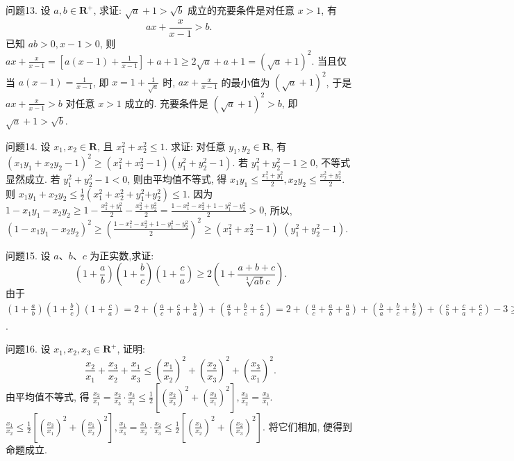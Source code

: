 问题13. 设 $a, b \in \mathbf{R}^{+}$, 求证: $\sqrt{a}+1>\sqrt{b}$ 成立的充要条件是对任意 $x>1$, 有
$$
a x+\frac{x}{x-1}>b \text {. }
$$
已知 $a b>0, x-1>0$, 则 $a x+\frac{x}{x-1}=\left[a(x-1)+\frac{1}{x-1}\right]+a+1 \geqslant 2 \sqrt{a}+a+1=(\sqrt{a}+1)^2$. 当且仅当 $a(x-1)=\frac{1}{x-1}$, 即 $x=1+\frac{1}{\sqrt{a}}$ 时, $a x+\frac{x}{x-1}$ 的最小值为 $(\sqrt{a}+1)^2$, 于是 $a x+\frac{x}{x-1}>b$ 对任意 $x>1$ 成立的.
充要条件是 $(\sqrt{a}+1)^2>b$, 即 $\sqrt{a}+1>\sqrt{b}$.



问题14. 设 $x_1, x_2 \in \mathbf{R}$, 且 $x_1^2+x_2^2 \leqslant 1$. 求证: 对任意 $y_1, y_2 \in \mathbf{R}$, 有 $\left(x_1 y_1+\right. \left.x_2 y_2-1\right)^2 \geqslant\left(x_1^2+x_2^2-1\right)\left(y_1^2+y_2^2-1\right)$.
若 $y_1^2+y_2^2-1 \geqslant 0$, 不等式显然成立.
若 $y_1^2+y_2^2-1<0$, 则由平均值不等式, 得 $x_1 y_1 \leqslant \frac{x_1^2+y_1^2}{2}, x_2 y_2 \leqslant \frac{x_2^2+y_2^2}{2}$. 则 $x_1 y_1+x_2 y_2 \leqslant \frac{1}{2}\left(x_1^2+x_2^2+y_1^2\right. \left.+y_2^2\right) \leqslant 1$. 因为 $1-x_1 y_1-x_2 y_2 \geqslant 1-\frac{x_1^2+y_1^2}{2}-\frac{x_2^2+y_2^2}{2}=\frac{1-x_1^2-x_2^2+1-y_1^2-y_2^2}{2} >0$, 所以, $\left(1-x_1 y_1-x_2 y_2\right)^2 \geqslant\left(\frac{1-x_1^2-x_2^2+1-y_1^2-y_2^2}{2}\right)^2 \geqslant\left(x_1^2+x_2^2-1\right)$  $\left(y_1^2+y_2^2-1\right)$.



问题15. 设 $a 、 b 、 c$ 为正实数,求证:
$$
\left(1+\frac{a}{b}\right)\left(1+\frac{b}{c}\right)\left(1+\frac{c}{a}\right) \geqslant 2\left(1+\frac{a+b+c}{\sqrt[3]{a b} c}\right) .
$$
由于 $\left(1+\frac{a}{b}\right)\left(1+\frac{b}{c}\right)\left(1+\frac{c}{a}\right)=2+\left(\frac{a}{c}+\frac{c}{b}+\frac{b}{a}\right)+ \left(\frac{a}{b}+\frac{b}{c}+\frac{c}{a}\right)=2+\left(\frac{a}{c}+\frac{a}{b}+\frac{a}{a}\right)+\left(\frac{b}{a}+\frac{b}{c}+\frac{b}{b}\right)+\left(\frac{c}{b}+\frac{c}{a}+\frac{c}{c}\right)- 3 \geqslant-1+3 \frac{a+b+c}{\sqrt[3]{a b c}} \geqslant 2\left(1+\frac{a+b+c}{\sqrt[3]{a b c}}\right)$.



问题16. 设 $x_1, x_2, x_3 \in \mathbf{R}^{+}$, 证明:
$$
\frac{x_2}{x_1}+\frac{x_3}{x_2}+\frac{x_1}{x_3} \leqslant\left(\frac{x_1}{x_2}\right)^2+\left(\frac{x_2}{x_3}\right)^2+\left(\frac{x_3}{x_1}\right)^2 .
$$
由平均值不等式, 得 $\frac{x_2}{x_1}=\frac{x_2}{x_3} \cdot \frac{x_3}{x_1} \leqslant \frac{1}{2}\left[\left(\frac{x_2}{x_3}\right)^2+\left(\frac{x_3}{x_1}\right)^2\right], \frac{x_3}{x_2}=\frac{x_3}{x_1}$. $\frac{x_1}{x_2} \leqslant \frac{1}{2}\left[\left(\frac{x_3}{x_1}\right)^2+\left(\frac{x_1}{x_2}\right)^2\right], \frac{x_1}{x_3}=\frac{x_1}{x_2} \cdot \frac{x_2}{x_3} \leqslant \frac{1}{2}\left[\left(\frac{x_1}{x_2}\right)^2+\left(\frac{x_2}{x_3}\right)^2\right]$. 将它们相加, 便得到命题成立.




